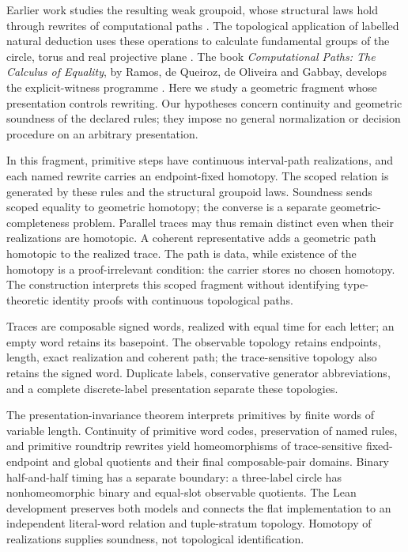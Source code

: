 \documentclass[10pt,reqno]{amsart}
\theoremstyle{definition}
\theoremstyle{plain}
\theoremstyle{remark}
\begin{document}
Earlier work studies the resulting weak groupoid, whose structural laws hold
through rewrites of computational paths
\cite{DeVerasRamosDeQueirozDeOliveira2025weak}. The topological application of
labelled natural deduction uses these operations to calculate fundamental
groups of the circle, torus and real projective plane
\cite{DeVerasRamosDeQueirozDeOliveira2025topological}. The book
\emph{Computational Paths: The Calculus of Equality}, by Ramos, de Queiroz,
de Oliveira and Gabbay, develops the explicit-witness programme
\cite{RamosDeQueirozDeOliveiraGabbay2026}. Here we study a geometric fragment
whose presentation controls rewriting.
Our hypotheses concern continuity and geometric soundness of the declared
rules; they impose no general normalization or decision procedure on an
arbitrary presentation.

In this fragment, primitive steps have continuous interval-path realizations,
and each named rewrite carries an endpoint-fixed homotopy. The scoped
relation is generated by these rules and the structural groupoid laws.
Soundness sends scoped equality to geometric homotopy; the converse is a
separate geometric-completeness problem. Parallel traces may thus remain
distinct even when their realizations are homotopic. A coherent representative
adds a geometric path homotopic to the realized trace. The path is data, while
existence of the homotopy is a proof-irrelevant condition: the carrier stores
no chosen homotopy. The construction interprets this scoped fragment without
identifying type-theoretic identity proofs with continuous topological paths.

Traces are composable signed words, realized with equal time for each letter;
an empty word retains its basepoint.
The observable topology retains endpoints, length, exact realization and
coherent path; the trace-sensitive topology also retains the signed word.
Duplicate labels, conservative generator abbreviations, and a complete
discrete-label presentation separate these topologies.

The presentation-invariance theorem interprets primitives by finite words of
variable length. Continuity of primitive word codes, preservation of named rules,
and primitive roundtrip rewrites yield homeomorphisms of trace-sensitive
fixed-endpoint and global quotients and their final composable-pair domains.
Binary half-and-half timing has a separate boundary: a three-label circle
has nonhomeomorphic binary and equal-slot observable quotients. The Lean
development preserves both models and connects the flat implementation to
an independent literal-word relation and tuple-stratum topology. Homotopy
of realizations supplies soundness, not topological identification.
\end{document}
